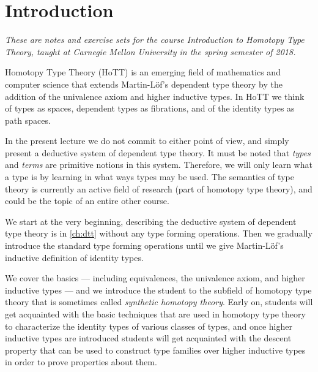 \chapter{Introduction}

\emph{These are notes and exercise sets for the course Introduction to Homotopy Type Theory, taught at Carnegie Mellon University in the spring semester of 2018.} 

\bigskip
\noindent Homotopy Type Theory (HoTT) is an emerging field of mathematics and computer science that extends Martin-Löf's dependent type theory by the addition of the univalence axiom and higher inductive types. In HoTT we think of types as spaces, dependent types as fibrations, and of the identity types as path spaces.

\begin{figure}

\end{figure}

In the present lecture we do not commit to either point of view, and simply present a deductive system of dependent type theory. It must be noted that \emph{types} and \emph{terms} are primitive notions in this system. Therefore, we will only learn what a type is by learning in what ways types may be used. The semantics of type theory is currently an active field of research (part of homotopy type theory), and could be the topic of an entire other course.

We start at the very beginning, describing the deductive system of dependent type theory is in \autoref{ch:dtt} without any type forming operations. Then we gradually introduce the standard type forming operations until we give Martin-L\"of's inductive definition of identity types. 

We cover the basics --- including equivalences, the univalence axiom, and higher inductive types --- and we introduce the student to the subfield of homotopy type theory that is sometimes called \emph{synthetic homotopy theory}. Early on, students will get acquainted with the basic techniques that are used in homotopy type theory to characterize the identity types of various classes of types, and once higher inductive types are introduced students will get acquainted with the descent property that can be used to construct type families over higher inductive types in order to prove properties about them.

